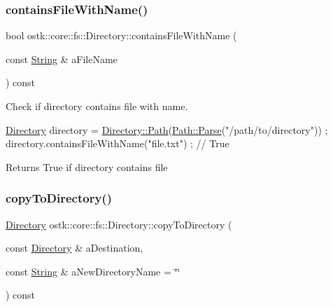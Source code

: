 \subsubsection{\texorpdfstring{contains\+File\+With\+Name()}{containsFileWithName()}}
{\footnotesize\ttfamily bool ostk\+::core\+::fs\+::\+Directory\+::contains\+File\+With\+Name (\begin{DoxyParamCaption}\item[{const \hyperlink{classostk_1_1core_1_1types_1_1_string}{String} \&}]{a\+File\+Name }\end{DoxyParamCaption}) const}



Check if directory contains file with name. 


\begin{DoxyCode}
\hyperlink{classostk_1_1core_1_1fs_1_1_directory_adc893e10f55282be0d0455e9cfc5796b}{Directory} directory = \hyperlink{classostk_1_1core_1_1fs_1_1_directory_a0151dba2940d5f426b52209dc7dab2e5}{Directory::Path}(\hyperlink{classostk_1_1core_1_1fs_1_1_path_ad08539ba654f5df11c4bcb07276345ad}{Path::Parse}(\textcolor{stringliteral}{"/path/to/directory"}))
       ;
directory.containsFileWithName(\textcolor{stringliteral}{"file.txt"}) ; \textcolor{comment}{// True}
\end{DoxyCode}


\begin{DoxyReturn}{Returns}
True if directory contains file 
\end{DoxyReturn}
\mbox{\label{classostk_1_1core_1_1fs_1_1_directory_a3403ab273accf228287aa4d86fc270ac}} 
\subsubsection{\texorpdfstring{copy\+To\+Directory()}{copyToDirectory()}}
{\footnotesize\ttfamily \hyperlink{classostk_1_1core_1_1fs_1_1_directory}{Directory} ostk\+::core\+::fs\+::\+Directory\+::copy\+To\+Directory (\begin{DoxyParamCaption}\item[{const \hyperlink{classostk_1_1core_1_1fs_1_1_directory}{Directory} \&}]{a\+Destination,  }\item[{const \hyperlink{classostk_1_1core_1_1types_1_1_string}{String} \&}]{a\+New\+Directory\+Name = {\ttfamily \char`\"{}\char`\"{}} }\end{DoxyParamCaption}) const}



